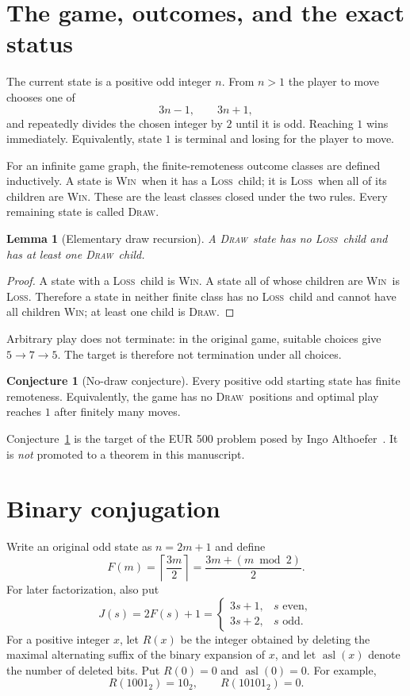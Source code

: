 \documentclass[11pt,a4paper]{article}
\newtheorem{lemma}[theorem]{Lemma}
\theoremstyle{definition}
\newtheorem{conjecture}[theorem]{Conjecture}
\theoremstyle{remark}
\newcommand{\WIN}{\textnormal{\textsc{Win}}}
\newcommand{\LOSS}{\textnormal{\textsc{Loss}}}
\newcommand{\DRAW}{\textnormal{\textsc{Draw}}}
\newcommand{\asl}{\operatorname{asl}}
\begin{document}
\tableofcontents

\section{The game, outcomes, and the exact status}

The current state is a positive odd integer $n$.  From $n>1$ the player to
move chooses one of
\[
  3n-1,\qquad 3n+1,
\]
and repeatedly divides the chosen integer by $2$ until it is odd.  Reaching
$1$ wins immediately.  Equivalently, state $1$ is terminal and losing for
the player to move.

For an infinite game graph, the finite-remoteness outcome classes are defined
inductively.  A state is \WIN\ when it has a \LOSS\ child; it is \LOSS\ when
all of its children are \WIN.  These are the least classes closed under the
two rules.  Every remaining state is called \DRAW.

\begin{lemma}[Elementary draw recursion]\label{lem:draw-recursion}
A \DRAW\ state has no \LOSS\ child and has at least one \DRAW\ child.
\end{lemma}

\begin{proof}
A state with a \LOSS\ child is \WIN.  A state all of whose children are
\WIN\ is \LOSS.  Therefore a state in neither finite class has no \LOSS\
child and cannot have all children \WIN; at least one child is \DRAW.
\end{proof}

Arbitrary play does not terminate: in the original game, suitable choices
give $5\to7\to5$.  The target is therefore not termination under all choices.

\begin{conjecture}[No-draw conjecture]\label{conj:main}
Every positive odd starting state has finite remoteness.  Equivalently, the
game has no \DRAW\ positions and optimal play reaches $1$ after finitely
many moves.
\end{conjecture}

Conjecture~\ref{conj:main} is the target of the EUR 500 problem posed by
Ingo Althoefer~\cite{Prize}.  It is \emph{not} promoted to a theorem in this
manuscript.

\section{Binary conjugation}

Write an original odd state as $n=2m+1$ and define
\[
  F(m)=\left\lceil\frac{3m}{2}\right\rceil
       =\frac{3m+(m\bmod2)}{2}.
\]
For later factorization, also put
\[
 J(s)=2F(s)+1=
 \begin{cases}
  3s+1,&s\text{ even},\\
  3s+2,&s\text{ odd}.
 \end{cases}
\]
For a positive integer $x$, let $R(x)$ be the integer obtained by deleting
the maximal alternating suffix of the binary expansion of $x$, and let
$\asl(x)$ denote the number of deleted bits.  Put $R(0)=0$ and
$\asl(0)=0$.
For example,
\[
 R(1001_2)=10_2,
 \qquad
 R(10101_2)=0.
\]
\end{document}
